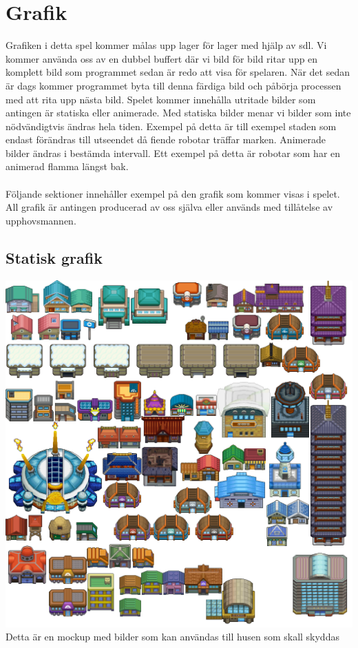 \documentclass{TDP003mall}
\begin{document}
\section{Grafik}
Grafiken i detta spel kommer målas upp lager för lager med hjälp av sdl. Vi kommer använda oss av en dubbel buffert där vi bild för bild ritar upp en komplett bild som programmet sedan är redo att visa för spelaren. När det sedan är dags kommer programmet byta till denna färdiga bild och påbörja processen med att rita upp nästa bild. Spelet kommer innehålla utritade bilder som antingen är statiska eller animerade. Med statiska bilder menar vi bilder som inte nödvändigtvis ändras hela tiden. Exempel på detta är till exempel staden som endast förändras till utseendet då fiende robotar träffar marken. Animerade bilder ändras i bestämda intervall. Ett exempel på detta är robotar som har en animerad flamma längst bak.\\\\

Följande sektioner innehåller exempel på den grafik som kommer visas i spelet. All grafik är antingen producerad av oss själva eller används med tillåtelse av upphovsmannen.



\subsection{Statisk grafik}

\includegraphics[scale=0.3]{5.png}
\\
Detta är en mockup med bilder som kan användas till husen som skall skyddas
\end{document}
